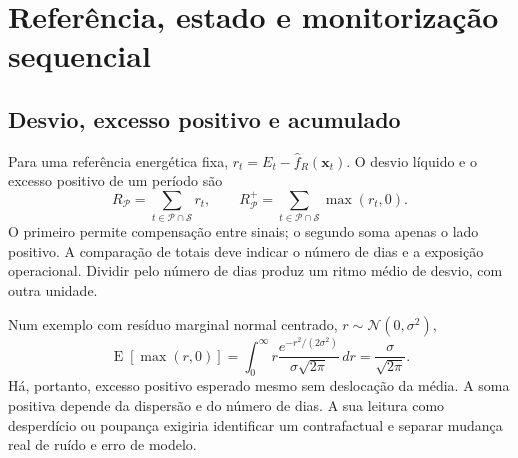 
\section{Referência, estado e monitorização sequencial}
\label{sec:mat-monitorizacao}

\subsection{Desvio, excesso positivo e acumulado}
\label{sec:mat-excesso}
Para uma referência energética fixa, $r_t=E_t-\widehat f_R(\boldsymbol x_t)$. O desvio líquido e o excesso positivo de um período são
\begin{equation}
R_{\mathcal P}=\sum_{t\in\mathcal P\cap\mathcal S}r_t,
\qquad R_{\mathcal P}^{+}=\sum_{t\in\mathcal P\cap\mathcal S}\max(r_t,0).
\label{eq:mat-acumulados}
\end{equation}
O primeiro permite compensação entre sinais; o segundo soma apenas o lado positivo. A comparação de totais deve indicar o número de dias e a exposição operacional. Dividir pelo número de dias produz um ritmo médio de desvio, com outra unidade.

Num exemplo com resíduo marginal normal centrado, $r\sim\mathcal N(0,\sigma^2)$,
\begin{equation}
\operatorname{E}[\max(r,0)]=\int_0^\infty r\frac{e^{-r^2/(2\sigma^2)}}{\sigma\sqrt{2\pi}}\,dr
=\frac{\sigma}{\sqrt{2\pi}}.
\label{eq:mat-excesso-ruido}
\end{equation}
Há, portanto, excesso positivo esperado mesmo sem deslocação da média. A soma positiva depende da dispersão e do número de dias. A sua leitura como desperdício ou poupança exigiria identificar um contrafactual e separar mudança real de ruído e erro de modelo.

